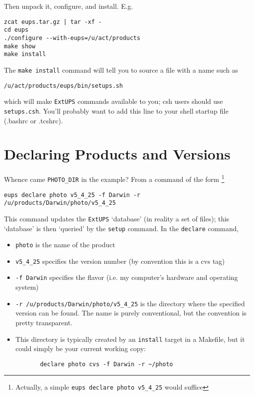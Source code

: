 \documentclass{article}
\newcommand{\code}[1]{\texttt{#1}}
\newcommand{\eups}{\code{ExtUPS}}
\begin{document}
Then unpack it, configure, and install.  E.g.
\begin{verbatim}
zcat eups.tar.gz | tar -xf -
cd eups
./configure --with-eups=/u/act/products
make show
make install
\end{verbatim}

The \code{make install} command will tell you to source a file
with a name such as
\begin{verbatim}
/u/act/products/eups/bin/setups.sh
\end{verbatim}
which will make \eups{} commands available to you; csh users should
use \code{setups.csh}.  You'll probably want to add this line to your
shell startup file (.bashrc or .tcshrc).

\section{Declaring Products and Versions}

Whence came \code{PHOTO\_DIR} in the example? From a command of the form
\footnote{Actually, a simple \code{eups declare photo v5\_4\_25} would suffice}
\begin{verbatim}
eups declare photo v5_4_25 -f Darwin -r /u/products/Darwin/photo/v5_4_25
\end{verbatim}

This command updates the \eups{} `database' (in reality a set of files);
this `database' is then `queried' by the \code{setup} command. In
the \code{declare} command,
\begin{itemize}
  \item
    \code{photo} is the name of the product

  \item
    \code{v5\_4\_25} specifies the version number (by convention this
    is a cvs tag)

  \item
    \code{-f Darwin} specifies the flavor (i.e. my computer's hardware and
    operating system)

  \item
    \code{-r /u/products/Darwin/photo/v5\_4\_25} is the directory where
    the specified version can be found. The name is purely conventional,
    but the convention is pretty transparent.

  \item
    This directory is typically created by an \code{install} target
    in a Makefile, but it could simply be your current working
    copy:
\begin{verbatim}
       declare photo cvs -f Darwin -r ~/photo
\end{verbatim}
\end{itemize}
\end{document}
